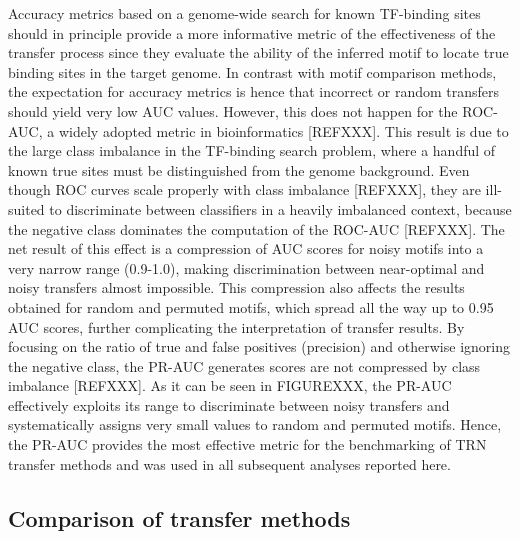 Accuracy metrics based on a genome-wide search for known TF-binding sites
should in principle provide a more informative metric of the effectiveness of
the transfer process since they evaluate the ability of the inferred motif to
locate true binding sites in the target genome. In contrast with motif
comparison methods, the expectation for accuracy metrics is hence that
incorrect or random transfers should yield very low AUC values. However, this
does not happen for the ROC-AUC, a widely adopted metric in bioinformatics
[REFXXX]. This result is due to the large class imbalance in the TF-binding
search problem, where a handful of known true sites must be distinguished from
the genome background. Even though ROC curves scale properly with class
imbalance [REFXXX], they are ill-suited to discriminate between classifiers in
a heavily imbalanced context, because the negative class dominates the
computation of the ROC-AUC [REFXXX]. The net result of this effect is a
compression of AUC scores for noisy motifs into a very narrow range (0.9-1.0),
making discrimination between near-optimal and noisy transfers almost
impossible. This compression also affects the results obtained for random and
permuted motifs, which spread all the way up to 0.95 AUC scores, further
complicating the interpretation of transfer results. By focusing on the ratio
of true and false positives (precision) and otherwise ignoring the negative
class, the PR-AUC generates scores are not compressed by class imbalance
[REFXXX]. As it can be seen in FIGUREXXX, the PR-AUC effectively exploits its
range to discriminate between noisy transfers and systematically assigns very
small values to random and permuted motifs. Hence, the PR-AUC provides the most
effective metric for the benchmarking of TRN transfer methods and was used in
all subsequent analyses reported here.

\subsection{Comparison of transfer methods}

